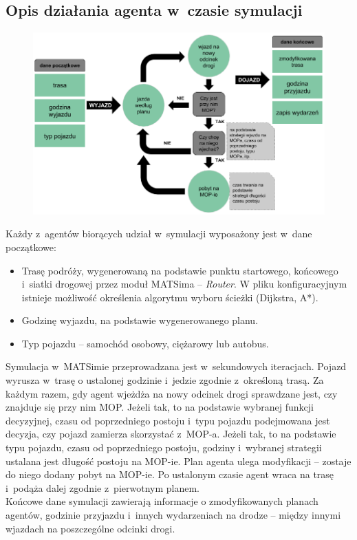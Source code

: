 \subsection{Opis działania agenta w~czasie symulacji}
    \begin{figure}[h]
        \includegraphics[width=\textwidth]{images/mopsim/agent-dzialanie.png}
    \end{figure}
Każdy z~agentów biorących udział w~symulacji wyposażony jest w~dane początkowe:
\begin{itemize}
\item Trasę podróży, wygenerowaną na podstawie punktu startowego, końcowego i~siatki drogowej przez moduł MATSima -- \textit{Router}. W pliku konfiguracyjnym istnieje możliwość określenia algorytmu wyboru ścieżki (Dijkstra, A*).
\item Godzinę wyjazdu, na podstawie wygenerowanego planu.
\item Typ pojazdu -- samochód osobowy, ciężarowy lub autobus.
\end{itemize}
Symulacja w~MATSimie przeprowadzana jest w~sekundowych iteracjach. Pojazd wyrusza w~trasę o ustalonej godzinie i~jedzie zgodnie z~określoną trasą. Za każdym razem, gdy agent wjeżdża na nowy odcinek drogi sprawdzane jest, czy znajduje się przy nim MOP. Jeżeli tak, to na podstawie wybranej funkcji decyzyjnej, czasu od poprzedniego postoju i~typu pojazdu podejmowana jest decyzja, czy pojazd zamierza skorzystać z~MOP-a. Jeżeli tak, to na podstawie typu pojazdu, czasu od poprzedniego postoju, godziny i~wybranej strategii ustalana jest długość postoju na MOP-ie. Plan agenta ulega modyfikacji -- zostaje do niego dodany pobyt na MOP-ie. Po ustalonym czasie agent wraca na trasę i~podąża dalej zgodnie z~pierwotnym planem. \\
Końcowe dane symulacji zawierają informacje o zmodyfikowanych planach agentów, godzinie przyjazdu i~innych wydarzeniach na drodze -- między innymi wjazdach na poszczególne odcinki drogi.
